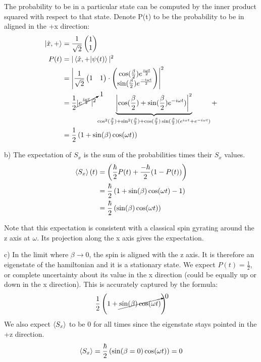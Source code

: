 \documentclass[10pt]{scrartcl}
\begin{document}
The probability to be in a particular state can be computed by the inner product squared with respect to that state. Denote P(t) to be the probability to be in aligned in the +x direction:
\begin{align}
	\ket{\hat{x}, +} &= {1 \over \sqrt{2}} \begin{pmatrix}
		1  \\
		1
	\end{pmatrix}\\
P(t) &= |\braket{\hat{x}, +| \psi (t)}|^2 \\
&= \left| {1 \over \sqrt{2}} \begin{pmatrix}
	1  & 1
\end{pmatrix} \cdot 
\begin{pmatrix}
	\cos({\beta \over 2}) e^{i \omega t \over 2} \\
	\sin({\beta \over 2}) e^{-i \omega t \over 2}
\end{pmatrix} \right|^2 \\
&= {1 \over 2} \cancelto{1}{|e^{i \omega t \over 2}|^2}  \underbrace{\left| \cos({\beta \over 2}) + 
\sin({\beta \over 2}) e^{-i \omega t})\right|^2}_{\cos^2({\beta \over 2}) + \sin^2({\beta \over 2})  + \cos({\beta \over 2}) \sin({\beta \over 2}) (e^{i \omega t} + e^{- i \omega t}) }  + \\
& = \frac12 \left(1 + \sin(\beta) \cos(\omega t) \right)
	\end{align}

b)  The expectation of $S_x$ is the sum of the probabilities times their $S_x$ values.
\begin{align}
	\braket{S_x}(t) & = \left( {\hbar \over 2} P(t) + {-\hbar \over 2} (1-P(t)) \right) \\ 
	& = {\hbar \over 2} \left( 1 + \sin(\beta) \cos(\omega t) - 1 \right) \\
	& = {\hbar \over 2} \left( \sin(\beta) \cos( \omega t) \right)
	\end{align}

Note that this expectation is consistent with a classical spin gyrating around the z axis at $\omega$.  Its projection along the x axis gives the expectation. 

c) In the limit where $\beta \rightarrow 0$, the spin is aligned with the z axis.  It is therefore an eigenstate of the hamiltonian and it is a stationary state.   We expect $P(t) = \frac12$, or complete uncertainty about its value in the x direction (could be equally up or down in the x direction).  This is accurately captured by the formula:
\[  \frac12 \left(1 + \cancelto{0}{\sin(\beta) \cos(\omega t)} \right)\]
We also expect $\braket{S_x}$ to be 0 for all times since the eigenstate stays pointed in the +z direction.
\[ \braket{S_x} = {\hbar \over 2} \left( \sin(\beta = 0) \cos( \omega t) \right) = 0 \]
\end{document}
